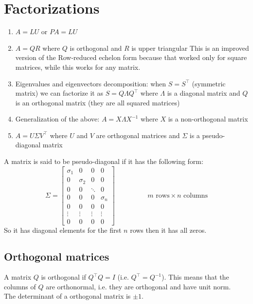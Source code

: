 \section{Factorizations}
\begin{enumerate}
    \item $A = LU$ or $PA = LU$
    \item $A = QR$ where $Q$ is orthogonal and $R$ is upper triangular
    This is an improved version of the Row-reduced echelon form because that worked only for square matrices, while this works for any matrix.
    \item Eigenvalues and eigenvectors decomposition: when $S = S^\intercal$ (symmetric matrix) we can factorize it as $S = Q\Lambda Q^\intercal$ where $\Lambda$ is a diagonal matrix and $Q$ is an orthogonal matrix (they are all squared matrices)
    \item Generalization of the above: $A = X\Lambda X^{-1}$ where $X$ is a non-orthogonal matrix
    \item $A = U\Sigma V^\intercal$ where $U$ and $V$ are orthogonal matrices and $\Sigma$ is a pseudo-diagonal matrix
\end{enumerate}
A matrix is said to be pseudo-diagonal if it has the following form:
\[
    \Sigma = 
    \begin{bmatrix}
        \sigma_1 & 0 & 0 & 0\\
        0 & \sigma_2 & 0 & 0\\
        0 & 0 & \ddots & 0\\
        0 & 0 & 0 & \sigma_n\\
        0 & 0 & 0 & 0\\
        \vdots & \vdots & \vdots & \vdots\\
        0 & 0 & 0 & 0
    \end{bmatrix}
    \hspace{2cm}
    m \text{ rows} \times n \text{ columns}
\]
So it has diagonal elements for the first $n$ rows then it has all zeros.

\subsection{Orthogonal matrices}
A matrix $Q$ is orthogonal if $Q^\intercal Q = I$ (i.e. $Q^\intercal = Q^{-1}$). This means that the columns of $Q$ are orthonormal, i.e. they are orthogonal and have unit norm.\\

The determinant of a orthogonal matrix is $\pm 1$.

